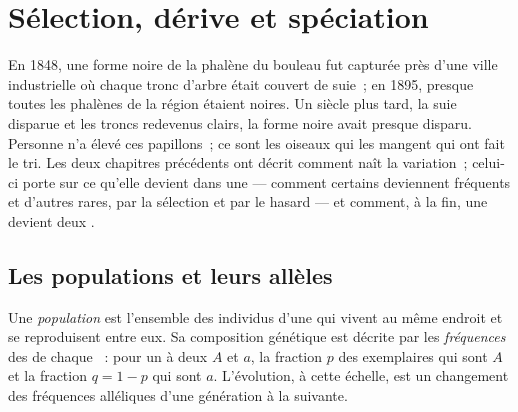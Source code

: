 \chapter{Sélection, dérive et spéciation}\label{ch:g12:selection-drift-speciation}

En 1848, une forme noire de la phalène du bouleau fut capturée près
d'une ville industrielle où chaque tronc d'arbre était couvert de
suie~; en 1895, presque toutes les phalènes de la région étaient
noires. Un siècle plus tard, la suie disparue et les troncs redevenus
clairs, la forme noire avait presque disparu. Personne n'a élevé ces
papillons~; ce sont les oiseaux qui les mangent qui ont fait le tri.
Les deux chapitres précédents ont décrit comment naît la variation~;
celui-ci porte sur ce qu'elle devient dans une  --- comment
certains  deviennent fréquents et d'autres rares, par la
sélection et par le hasard --- et comment, à la fin, une 
devient deux .

\section{Les populations et leurs allèles}

\begin{definition}\label{def:g12:selection-drift-speciation:population}
Une \emph{population} est l'ensemble des individus
d'une  qui vivent au même endroit et se reproduisent entre eux.
Sa composition génétique est décrite par les
\emph{fréquences} des  de chaque
~: pour un  à deux  $A$ et $a$, la fraction $p$ des
exemplaires qui sont $A$ et la fraction $q = 1 - p$ qui sont $a$.
L'évolution, à cette échelle, est un changement des fréquences
alléliques d'une génération à la suivante.
\end{definition}

